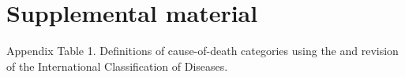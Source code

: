 \documentclass[11.5pt]{article}
\begin{document}
\newpage

\section*{Supplemental material}
Appendix Table 1. Definitions of cause-of-death categories using the  and  revision of the International Classification of Diseases.\\

{\renewcommand{\baselinestretch}{1}\selectfont

}
\end{document}
